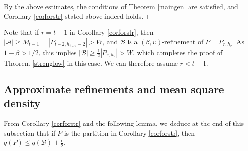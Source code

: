 \documentclass[11pt]{article}
\newcommand{\qed}{\hfill \ensuremath{\Box}}
\begin{document}
By the above estimates, the conditions of Theorem \ref{maingen} are satisfied,
and Corollary \ref{corforstr} stated above indeed holds. \qed 

Note that if $r=t-1$ in Corollary \ref{corforstr}, then $|\mathcal{A}| \geq M_{t-1}=|P_{t-2,h_{t-2}-2}|>W$, and 
$\mathcal{B}$ is a $(\beta,\upsilon)$-refinement of $P=P_{r,h_r}$. 
As $1-\beta>1/2$, this implies $|\mathcal{B}| \geq \frac{1}{2}|P_{r,h_r}| > W$, which
completes the proof of Theorem \ref{stronglow} in this case. We can therefore assume $r<t-1$.  

\subsection{Approximate refinements and mean square density}\label{sub42}

From Corollary \ref{corforstr} and the following lemma, we deduce at the end of
this subsection that
if $P$ is the partition in Corollary \ref{corforstr}, then $q(P) \leq
q(\mathcal{B})+\frac{\epsilon}{2}$.
\end{document}
